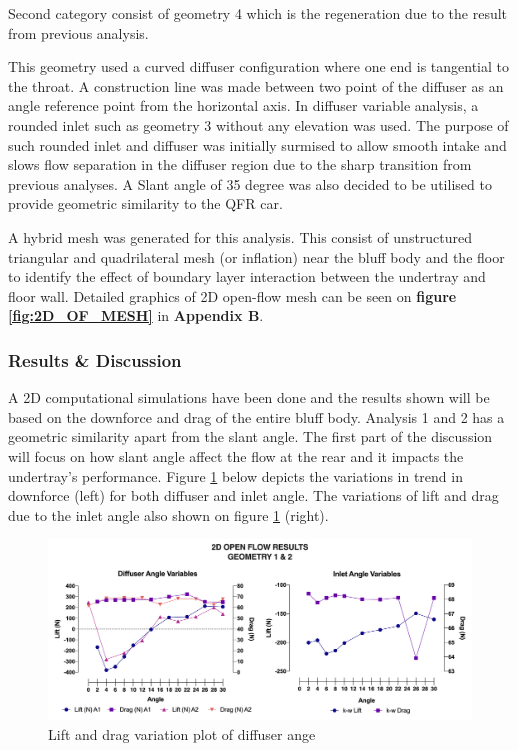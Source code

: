 \noindent Second category consist of geometry 4 which is the regeneration due to the result from previous analysis.

\noindent This geometry used a curved diffuser configuration where one end is tangential to the throat. A construction line was made between two point of the diffuser as an angle reference point from the horizontal axis. In diffuser variable analysis, a rounded inlet such as geometry 3 without any elevation was used. The purpose of such rounded inlet and diffuser was initially surmised to allow smooth intake and slows flow separation in the diffuser region due to the sharp transition from previous analyses. A Slant angle of 35 degree was also decided to be utilised to provide geometric similarity to the QFR car.

\noindent A hybrid mesh was generated for this analysis. This consist of unstructured triangular and quadrilateral mesh (or inflation) near the bluff body and the floor to identify the effect of boundary layer interaction between the undertray and floor wall.  Detailed graphics of 2D open-flow mesh can be seen on \textbf{figure \ref{fig:2D_OF_MESH}} in \textbf{Appendix B}.



\subsubsection{Results \& Discussion}

\noindent A 2D computational simulations have been done and the results shown will be based on the downforce and drag of the entire bluff body. Analysis 1 and 2 has a geometric similarity apart from the slant angle. The first part of the discussion will focus on how slant angle affect the flow at the rear and it impacts the undertray's performance. Figure \ref{fig:2D_OF_A12_results} below depicts the variations in trend in downforce (left) for both diffuser and inlet angle. The variations of lift and drag due to the inlet angle also shown on figure \ref{fig:2D_OF_A12_results} (right).

\begin{figure}[!ht]
    \centering
    \includegraphics[scale = 0.65]{Figures/Graph/2D_OF_A1-2.png}
    \caption{Lift and drag variation plot of diffuser ange }
    \label{fig:2D_OF_A12_results}
\end{figure}







